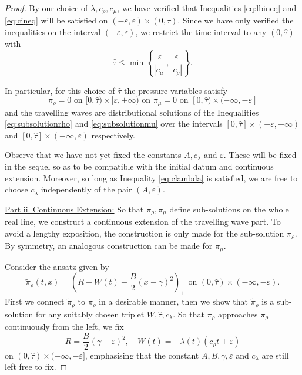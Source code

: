 \documentclass[a4paper,twosided, 11pt]{article}
\newcommand {\e}  {\varepsilon}
\theoremstyle{plain}
\theoremstyle{remark}
\numberwithin{equation}{section}
\begin{document}
\begin{proof}
By our choice of $\lambda, c_\rho, c_\mu$, we have verified that Inequalities \eqref{eq:lbineq} and \eqref{eq:cineq} will be satisfied on $(-\e,\e) \times (0,\tau)$. 
Since we have only verified the inequalities on the interval $(-\e,\e)$, we restrict the time interval to any $(0,\hat{\tau})$ with 
\begin{equation}\label{eq:tauhat}
    \hat{\tau} \leq \min\left\{\frac{\e}{|c_\mu|},\frac{\e}{|c_\rho|}\right\}.
\end{equation}

In particular, for this choice of $\hat{\tau}$ the pressure variables satisfy 
\[
\pi_\rho = 0 \text{ on }[0,\hat{\tau})\times [\e,+\infty)
\text{ on } \pi_\mu = 0 \text{ on } [0,\hat{\tau})\times (-\infty,-\e]
\]
and the travelling waves are distributional solutions of the Inequalities \eqref{eq:subsolutionrho} and \eqref{eq:subsolutionmu} over the intervals $[0,\hat{\tau}] \times (-\e,+\infty)$ and $[0,\hat{\tau}] \times (-\infty,\e)$ respectively.

\medskip 


Observe that we have not yet fixed the constants $A, c_\lambda$ and $\e$. 
These will be fixed in the sequel so as to be compatible with the initial datum and continuous extension.
Moreover, so long as Inequality \eqref{eq:clambda} is satisfied, we are free to choose $c_\lambda$ independently of the pair $(A,\e)$.

\medskip 

\underline{Part ii. Continuous Extension:}
So that $\pi_\rho, \pi_\mu$ define sub-solutions on the whole real line, we construct a continuous extension of the travelling wave part.
To avoid a lengthy exposition, the construction is only made for the sub-solution $\pi_{\rho}$. 
By symmetry, an analogous construction can be made for $\pi_\mu$.

\medskip 

Consider the ansatz given by  
\begin{equation}\label{eq:extension}
  \tilde{\pi}_\rho(t,x) = \left(R - W(t) - \frac{B}{2}(x-\gamma )^2\right)_{+} \text{ on } (0,\hat{\tau}) \times (-\infty, -\e) .
\end{equation}
First we connect $\tilde{\pi}_\rho$ to $\pi_\rho$ in a desirable manner, then we show that $\tilde{\pi}_\rho$ is a sub-solution for any suitably chosen triplet $W,\hat{\tau}, c_\lambda $. 
So that $\tilde{\pi}_\rho$ approaches $\pi_\rho$ continuously from the left, we fix 
\[
R = \frac{B}{2}(\gamma + \e)^2, \quad W(t) = -\lambda(t) (c_\rho t+ \e)
\]
on $(0,\hat{\tau}) \times (-\infty, -\e]$, emphasising that the constant $A,B, \gamma, \e$ and $c_\lambda$ are still left free to fix.


\end{proof}
\end{document}
